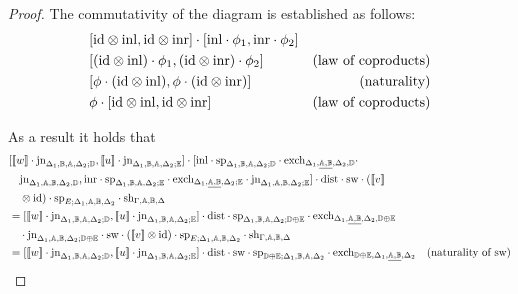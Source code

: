 \documentclass[10pt,a4paper]{amsart}
\theoremstyle{definition}
\theoremstyle{definition}
\theoremstyle{definition}
\theoremstyle{definition}
\theoremstyle{definition}
\theoremstyle{definition}
\begin{document}
\begin{proof}
The commutativity of the diagram is established as follows:
\begin{align*}
  & [\text{id} \otimes\mathrm{inl},\text{id} \otimes\mathrm{inr}] \cdot [\mathrm{inl} \cdot \phi_1,\mathrm{inr} \cdot \phi_2 ] \\
  & [(\text{id} \otimes\mathrm{inl}) \cdot \phi_1,(\text{id} \otimes\mathrm{inr}) \cdot \phi_2 ] & {\text{(law of coproducts)}}  \\
  & [\phi \cdot (\text{id} \otimes\mathrm{inl}), \phi \cdot (\text{id} \otimes\mathrm{inr})] & {\text{(naturality)}} \\
  & \phi \cdot  [\text{id} \otimes\mathrm{inl},\text{id} \otimes\mathrm{inr}]  & {\text{(law of coproducts)}}
\end{align*}
 
As a result it holds that 
\begin{align*}
  & [[\![ w ]\!] \cdot \text{jn}_{\Delta_{1} ,\typeB,\typeA,  \Delta_{2};\typeD},  [\![u ]\!] \cdot \text{jn}_{\Delta_{1} ,\typeB,\typeA,  \Delta_{2};\typeE}] \cdot [\inl \cdot  \text{sp}_{\Delta_{1}, \typeB, \typeA, \Delta_{2};\typeD} \cdot  \text{exch}_{\Delta_{1},\underline{\typeA,\typeB},  \Delta_{2},\typeD} \cdot   \\
  & \hspace{10pt}  \text{jn}_{\Delta_{1},\typeA,\typeB,  \Delta_{2},\typeD}, \inr \cdot  \text{sp}_{\Delta_{1}, \typeB, \typeA, \Delta_{2};\typeE} \cdot  \text{exch}_{\Delta_{1},\underline{\typeA,\typeB},  \Delta_{2};\typeE} \cdot  \text{jn}_{\Delta_{1},\typeA,\typeB,  \Delta_{2};\typeE} ] \cdot \text{dist} \cdot \text{sw} \cdot ([\![  v   ]\!] \\
  & \hspace{10pt} \otimes \text{id})  \cdot\text{sp}_{E; \Delta_{1},\typeA,\typeB,  \Delta_{2}} \cdot \text{sh}_{\Gamma,\typeA, \typeB,\Delta} \\ 
  & = [[\![ w ]\!] \cdot \text{jn}_{\Delta_{1} ,\typeB,\typeA,  \Delta_{2};\typeD},  [\![u ]\!] \cdot \text{jn}_{\Delta_{1} ,\typeB,\typeA,  \Delta_{2};\typeE}] \cdot \text{dist} \cdot \text{sp}_{\Delta_{1}, \typeB, \typeA, \Delta_{2}; \typeD \oplus\typeE} \cdot  \text{exch}_{\Delta_{1},\underline{\typeA,\typeB},  \Delta_{2}, \typeD \oplus\typeE}\\
  & \hspace{10pt}  \cdot  \text{jn}_{\Delta_{1},\typeA,\typeB,  \Delta_{2}; \typeD \oplus\typeE}  \cdot \text{sw} \cdot ([\![  v ]\!] \otimes \text{id})  \cdot\text{sp}_{E; \Delta_{1},\typeA,\typeB,  \Delta_{2}} \cdot \text{sh}_{\Gamma,\typeA, \typeB,\Delta}\\
  & = [[\![ w ]\!] \cdot \text{jn}_{\Delta_{1} ,\typeB,\typeA,  \Delta_{2};\typeD},  [\![u ]\!] \cdot \text{jn}_{\Delta_{1} ,\typeB,\typeA,  \Delta_{2};\typeE}] \cdot \text{dist} \cdot \text{sw} \cdot \text{sp}_{\typeD \oplus\typeE;\Delta_{1}, \typeB, \typeA, \Delta_{2}} \cdot  \text{exch}_{\typeD \oplus\typeE, \Delta_{1},\underline{\typeA,\typeB},  \Delta_{2}} & {\text{(naturality of sw)}} \\

\end{align*}
\end{proof}
\end{document}
